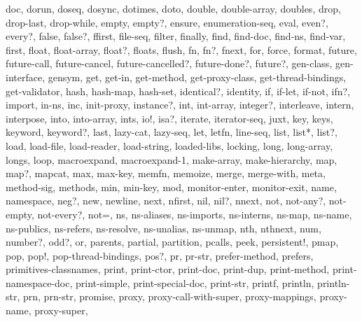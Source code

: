 {{    doc,
    dorun,
    doseq,
    dosync,
    dotimes,
    doto,
    double,
    double-array,
    doubles,
    drop,
    drop-last,
    drop-while,
    empty,
    empty?,
    ensure,
    enumeration-seq,
    eval,
    even?,
    every?,
    false,
    false?,
    ffirst,
    file-seq,
    filter,
    finally,
    find,
    find-doc,
    find-ns,
    find-var,
    first,
    float,
    float-array,
    float?,
    floats,
    flush,
    fn,
    fn?,
    fnext,
    for,
    force,
    format,
    future,
    future-call,
    future-cancel,
    future-cancelled?,
    future-done?,
    future?,
    gen-class,
    gen-interface,
    gensym,
    get,
    get-in,
    get-method,
    get-proxy-class,
    get-thread-bindings,
    get-validator,
    hash,
    hash-map,
    hash-set,
    identical?,
    identity,
    if,
    if-let,
    if-not,
    ifn?,
    import,
    in-ns,
    inc,
    init-proxy,
    instance?,
    int,
    int-array,
    integer?,
    interleave,
    intern,
    interpose,
    into,
    into-array,
    ints,
    io!,
    isa?,
    iterate,
    iterator-seq,
    juxt,
    key,
    keys,
    keyword,
    keyword?,
    last,
    lazy-cat,
    lazy-seq,
    let,
    letfn,
    line-seq,
    list,
    list*,
    list?,
    load,
    load-file,
    load-reader,
    load-string,
    loaded-libs,
    locking,
    long,
    long-array,
    longs,
    loop,
    macroexpand,
    macroexpand-1,
    make-array,
    make-hierarchy,
    map,
    map?,
    mapcat,
    max,
    max-key,
    memfn,
    memoize,
    merge,
    merge-with,
    meta,
    method-sig,
    methods,
    min,
    min-key,
    mod,
    monitor-enter,
    monitor-exit,
    name,
    namespace,
    neg?,
    new,
    newline,
    next,
    nfirst,
    nil,
    nil?,
    nnext,
    not,
    not-any?,
    not-empty,
    not-every?,
    not=,
    ns,
    ns-aliases,
    ns-imports,
    ns-interns,
    ns-map,
    ns-name,
    ns-publics,
    ns-refers,
    ns-resolve,
    ns-unalias,
    ns-unmap,
    nth,
    nthnext,
    num,
    number?,
    odd?,
    or,
    parents,
    partial,
    partition,
    pcalls,
    peek,
    persistent!,
    pmap,
    pop,
    pop!,
    pop-thread-bindings,
    pos?,
    pr,
    pr-str,
    prefer-method,
    prefers,
    primitives-classnames,
    print,
    print-ctor,
    print-doc,
    print-dup,
    print-method,
    print-namespace-doc,
    print-simple,
    print-special-doc,
    print-str,
    printf,
    println,
    println-str,
    prn,
    prn-str,
    promise,
    proxy,
    proxy-call-with-super,
    proxy-mappings,
    proxy-name,
    proxy-super,
}}
